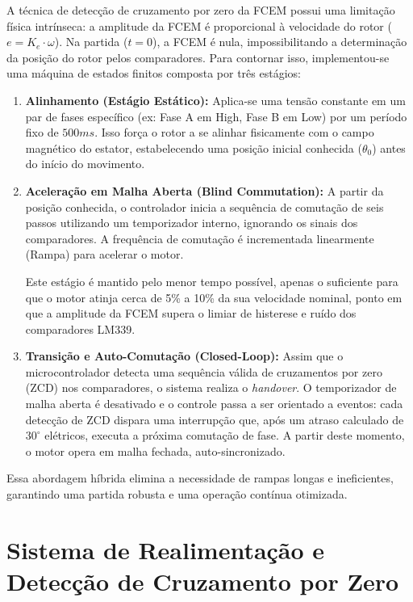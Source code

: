 \documentclass[12pt, a4paper, openright, oneside, brazilian]{abntex2}
\begin{document}
A técnica de detecção de cruzamento por zero da FCEM possui uma limitação física intrínseca: a amplitude da FCEM é proporcional à velocidade do rotor ($e = K_e \cdot \omega$). Na partida ($t=0$), a FCEM é nula, impossibilitando a determinação da posição do rotor pelos comparadores. Para contornar isso, implementou-se uma máquina de estados finitos composta por três estágios:

\begin{enumerate}
    \item \textbf{Alinhamento (Estágio Estático):} 
    Aplica-se uma tensão constante em um par de fases específico (ex: Fase A em High, Fase B em Low) por um período fixo de $500ms$. Isso força o rotor a se alinhar fisicamente com o campo magnético do estator, estabelecendo uma posição inicial conhecida ($\theta_0$) antes do início do movimento.
    
    \item \textbf{Aceleração em Malha Aberta (Blind Commutation):} 
    A partir da posição conhecida, o controlador inicia a sequência de comutação de seis passos utilizando um temporizador interno, ignorando os sinais dos comparadores. A frequência de comutação é incrementada linearmente (Rampa) para acelerar o motor.
    
    Este estágio é mantido pelo menor tempo possível, apenas o suficiente para que o motor atinja cerca de 5\% a 10\% da sua velocidade nominal, ponto em que a amplitude da FCEM supera o limiar de histerese e ruído dos comparadores LM339.
    
    \item \textbf{Transição e Auto-Comutação (Closed-Loop):} 
    Assim que o microcontrolador detecta uma sequência válida de cruzamentos por zero (ZCD) nos comparadores, o sistema realiza o \textit{handover}. O temporizador de malha aberta é desativado e o controle passa a ser orientado a eventos: cada detecção de ZCD dispara uma interrupção que, após um atraso calculado de $30^\circ$ elétricos, executa a próxima comutação de fase. A partir deste momento, o motor opera em malha fechada, auto-sincronizado.
\end{enumerate}

Essa abordagem híbrida elimina a necessidade de rampas longas e ineficientes, garantindo uma partida robusta e uma operação contínua otimizada.


\section{Sistema de Realimentação e Detecção de Cruzamento por Zero}
\end{document}
